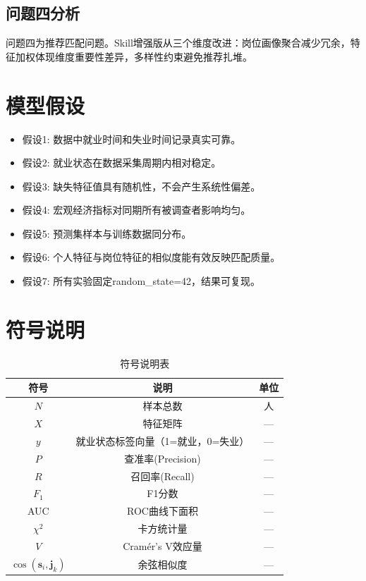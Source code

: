 \documentclass[withoutpreface,bwprint]{cumcmthesis}
\begin{document}
\subsection{问题四分析}
问题四为推荐匹配问题。Skill增强版从三个维度改进：岗位画像聚合减少冗余，特征加权体现维度重要性差异，多样性约束避免推荐扎堆。

\section{模型假设}

\begin{itemize}[itemindent=2em]
\item 假设1: 数据中就业时间和失业时间记录真实可靠。
\item 假设2: 就业状态在数据采集周期内相对稳定。
\item 假设3: 缺失特征值具有随机性，不会产生系统性偏差。
\item 假设4: 宏观经济指标对同期所有被调查者影响均匀。
\item 假设5: 预测集样本与训练数据同分布。
\item 假设6: 个人特征与岗位特征的相似度能有效反映匹配质量。
\item 假设7: 所有实验固定random\_state=42，结果可复现。
\end{itemize}

\section{符号说明}
\begin{table}[H]
\centering
\caption{符号说明表}
\begin{tabularx}{\textwidth}{CCC}
\toprule
符号 & 说明 & 单位 \\
\midrule
$N$ & 样本总数 & 人 \\
$X$ & 特征矩阵 & — \\
$y$ & 就业状态标签向量（1=就业，0=失业） & — \\
$P$ & 查准率(Precision) & — \\
$R$ & 召回率(Recall) & — \\
$F_1$ & F1分数 & — \\
AUC & ROC曲线下面积 & — \\
$\chi^2$ & 卡方统计量 & — \\
$V$ & Cramér's V效应量 & — \\
$\cos(\mathbf{s}_i,\mathbf{j}_k)$ & 余弦相似度 & — \\
\bottomrule
\end{tabularx}
\end{table}
\end{document}
